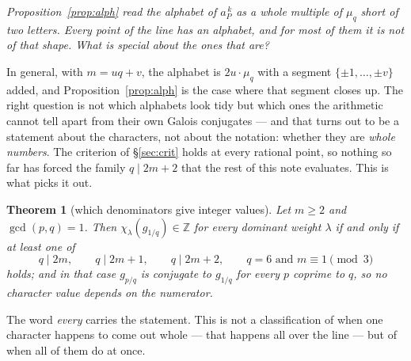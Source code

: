 \documentclass[11pt,a4paper]{article}
\newtheorem{theorem}{Theorem}[section]
\theoremstyle{definition}
\newcommand{\ZZ}{\mathbb{Z}}
\begin{document}
\noindent\emph{Proposition~\ref{prop:alph} read the alphabet of $a_P^{\,k}$ as a whole multiple of
$\mu_q$ short of two letters. Every point of the line has an alphabet, and for most of them it is
not of that shape. What is special about the ones that are?}

\smallskip
\noindent In general, with $m=uq+v$, the alphabet is $2u\cdot\mu_q$ with a segment
$\{\pm1,\dots,\pm v\}$ added, and Proposition~\ref{prop:alph} is the case where that segment closes
up. The right question is not which alphabets look tidy but which ones the arithmetic cannot tell
apart from their own Galois conjugates --- and that turns out to be a statement about the
characters, not about the notation: whether they are \emph{whole numbers}. The criterion of
\S\ref{sec:crit} holds at every rational point, so nothing so far has forced the family
$q\mid 2m+2$ that the rest of this note evaluates. This is what picks it out.

\begin{theorem}[which denominators give integer values]\label{thm:clasif}
Let $m\ge2$ and $\gcd(p,q)=1$. Then $\chi_\lambda(g_{1/q})\in\ZZ$ for \emph{every} dominant weight
$\lambda$ if and only if at least one of
\[
q\mid 2m,\qquad q\mid 2m+1,\qquad q\mid 2m+2,\qquad q=6 \text{ and } m\equiv1 \!\!\pmod 3
\]
holds; and in that case $g_{p/q}$ is conjugate to $g_{1/q}$ for every $p$ coprime to $q$, so no
character value depends on the numerator.
\end{theorem}

\noindent The word \emph{every} carries the statement. This is not a classification of when one
character happens to come out whole --- that happens all over the line --- but of when all of them
do at once.
\end{document}
